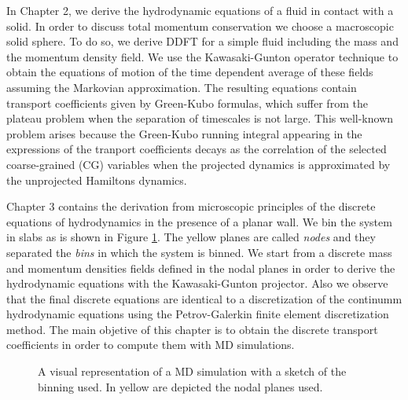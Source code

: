 \documentclass[b5paper,openright,10pt]{book}
\begin{document}
In Chapter 2, we derive the hydrodynamic equations of a fluid in contact with a solid. In order to discuss total momentum conservation we choose a macroscopic solid sphere. 
To do so, we derive DDFT for a simple fluid including the mass and the momentum density field.
We use the Kawasaki-Gunton operator technique to obtain the equations of motion of the time dependent average of these fields assuming the Markovian approximation. 
The resulting equations contain transport coefficients given by  Green-Kubo formulas, which suffer from the plateau problem when the separation of timescales is not large.  
This well-known problem arises because the Green-Kubo running integral appearing in the expressions of the tranport coefficients decays as the correlation of the selected coarse-grained (CG) variables when the projected dynamics is approximated by the unprojected Hamiltons dynamics. 

Chapter 3 contains the derivation from microscopic principles of the discrete equations of hydrodynamics in the presence of a planar wall. 
We bin the system in slabs as is shown in Figure \ref{fig:WallsBox1}. The yellow planes are called {\it nodes} and they separated the {\it bins} in which the system is binned. We start from a discrete mass and momentum densities fields defined in the nodal planes in order to derive the hydrodynamic equations with the Kawasaki-Gunton projector. Also we observe that the final discrete equations  are identical to a discretization of the continumm hydrodynamic equations using the Petrov-Galerkin finite element discretization method.   
The main objetive of this chapter is to obtain the discrete transport coefficients in order to compute them with MD simulations. 
\begin{figure}
    \centering
    \caption[Visual representation of a MD simulation with a sketch of the binning used]{A visual representation of a MD simulation with a sketch of the binning used. In yellow are depicted the nodal planes used.}
    \label{fig:WallsBox1}
\end{figure}
\end{document}
